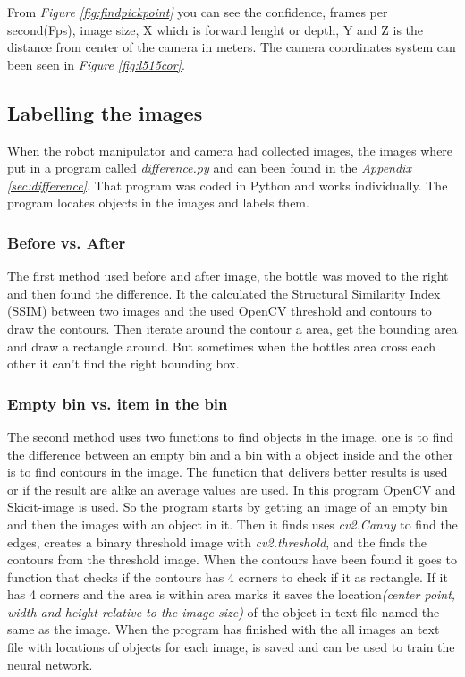 From \textit{Figure \ref{fig:findpickpoint}} you can see the confidence, frames per second(Fps), image size, X which is forward lenght or depth, Y and Z is the distance from center of the camera in meters. 
The camera coordinates system can been seen in \textit{Figure \ref{fig:l515cor}}.


\subsection{Labelling the images}\label{labelimg}
When the robot manipulator and camera had collected images, the images where put in a program called \textit{difference.py} and can been found in the \textit{Appendix \ref{sec:difference}}. That program was coded in Python and works individually. The program locates objects in the images and labels them. 


\subsubsection*{Before vs. After}
The first method used before and after image, the bottle was moved to the right and then found the difference. It the calculated the Structural Similarity Index (SSIM) between two images and the used OpenCV threshold and contours to draw the contours. Then iterate around the contour a area, get the bounding area and draw a rectangle around. But sometimes when the bottles area cross each other it can't find the right bounding box. 
\subsubsection*{Empty bin vs. item in the bin}
The second method uses two functions to find objects in the image, one is to find the difference between an empty bin and a bin with a object inside and the other is to find contours in the image. 
The function that delivers better results is used or if the result are alike an average values are used. 
In this program OpenCV and Skicit-image is used. 
So the program starts by getting an image of an empty bin and then the images with an object in it. 
Then it finds uses \textit{cv2.Canny} to find the edges, creates a binary threshold image with \textit{cv2.threshold}, and the finds the contours from the threshold image.  
When the contours have been found it goes to function that checks if the contours has 4 corners to check if it as rectangle. 
If it has 4 corners and the area is within area marks it saves the location\textit{(center point, width and height relative to the image size)} of the object in text file named the same as the image. 
When the program has finished with the all images an text file with locations of objects for each image, is saved and can be used to train the neural network.

